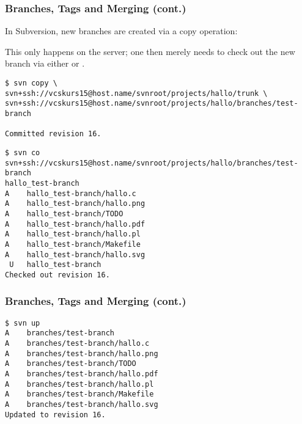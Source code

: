 \begin{frame}[fragile]
    \frametitle{Branches, Tags and Merging (cont.)}
    \linuxframe

    In Subversion, new branches are created via a copy operation:


    This only happens on the server; one then merely needs to check out the
    new branch via either  or .

\begin{lstlisting}[basicstyle=\tiny\ttfamily\color{black}]
$ svn copy \
svn+ssh://vcskurs15@host.name/svnroot/projects/hallo/trunk \
svn+ssh://vcskurs15@host.name/svnroot/projects/hallo/branches/test-branch

Committed revision 16.
\end{lstlisting}

\vspace*{-3mm}

\begin{lstlisting}[basicstyle=\tiny\ttfamily\color{black}]
$ svn co
svn+ssh://vcskurs15@host.name/svnroot/projects/hallo/branches/test-branch
hallo_test-branch
A    hallo_test-branch/hallo.c
A    hallo_test-branch/hallo.png
A    hallo_test-branch/TODO
A    hallo_test-branch/hallo.pdf
A    hallo_test-branch/hallo.pl
A    hallo_test-branch/Makefile
A    hallo_test-branch/hallo.svg
 U   hallo_test-branch
Checked out revision 16. 
\end{lstlisting}
\end{frame}

\begin{frame}[fragile]
    \frametitle{Branches, Tags and Merging (cont.)}
    \linuxframe

\begin{lstlisting}[basicstyle=\tiny\ttfamily\color{black}]
$ svn up
A    branches/test-branch
A    branches/test-branch/hallo.c
A    branches/test-branch/hallo.png
A    branches/test-branch/TODO
A    branches/test-branch/hallo.pdf
A    branches/test-branch/hallo.pl
A    branches/test-branch/Makefile
A    branches/test-branch/hallo.svg
Updated to revision 16.
\end{lstlisting}

\end{frame}

